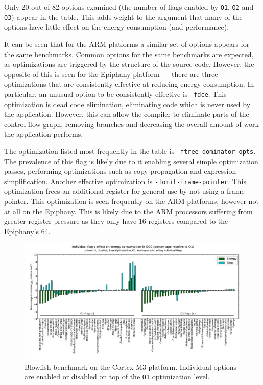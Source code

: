 \documentclass[twocolumn]{article}
\let\oldcaption\caption
\renewcommand{\caption}[1]{\oldcaption{\textup{#1}}}
\begin{document}
Only 20 out of 82 options examined (the number of flags enabled by \texttt{O1}, \texttt{O2} and \texttt{O3}) appear in the table. This adds weight to the argument that many of the options have little effect on the energy consumption (and performance).

It can be seen that for the ARM platforms a similar set of options appears for the same benchmarks. Common options for the same benchmarks are expected, as optimizations are triggered by the structure of the source code. However, the opposite of this is seen for the Epiphany platform --- there are three optimizations that are consistently effective at reducing energy consumption. In particular, an unusual option to be consistently effective is \texttt{-fdce}. This optimization is dead code elimination, eliminating code which is never used by the application. However, this can allow the compiler to eliminate parts of the control flow graph, removing branches and decreasing the overall amount of work the application performs.

The optimization listed most frequently in the table is \texttt{-ftree-dominator-opts}. The prevalence of this flag is likely due to it enabling several simple optimization passes, performing optimizations such as copy propagation and expression simplification. Another effective optimization is \texttt{-fomit-frame-pointer}. This optimization frees an additional register for general use by not using a frame pointer. This optimization is seen frequently on the ARM platforms, however not at all on the Epiphany. This is likely due to the ARM processors suffering from greater register pressure as they only have 16 registers compared to the Epiphany's 64.

\begin{figure}[t!h]
	\includegraphics[width=\linewidth,clip,trim=0.5cm 1.0cm 0cm 1.8cm]{cortex-m3/O1_addsub_blowfish.pdf}
	\caption{Blowfish benchmark on the Cortex-M3 platform. Individual options are enabled or disabled on top of the \texttt{O1} optimization level.}
	\label{Fig:AddsubO1Blowfish}
\end{figure}
\end{document}

